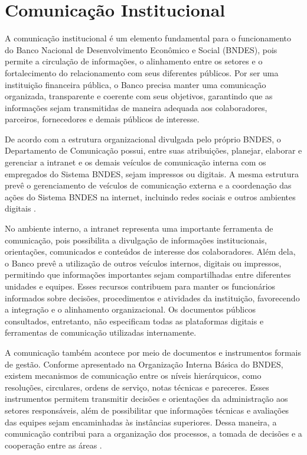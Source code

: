 \section{Comunicação Institucional}

A comunicação institucional é um elemento fundamental para o funcionamento do Banco Nacional de Desenvolvimento Econômico e Social (BNDES), pois permite a circulação de informações, o alinhamento entre os setores e o fortalecimento do relacionamento com seus diferentes públicos. Por ser uma instituição financeira pública, o Banco precisa manter uma comunicação organizada, transparente e coerente com seus objetivos, garantindo que as informações sejam transmitidas de maneira adequada aos colaboradores, parceiros, fornecedores e demais públicos de interesse.

De acordo com a estrutura organizacional divulgada pelo próprio BNDES, o Departamento de Comunicação possui, entre suas atribuições, planejar, elaborar e gerenciar a intranet e os demais veículos de comunicação interna com os empregados do Sistema BNDES, sejam impressos ou digitais. A mesma estrutura prevê o gerenciamento de veículos de comunicação externa e a coordenação das ações do Sistema BNDES na internet, incluindo redes sociais e outros ambientes digitais \cite{bndes2026quemsomos}.

No ambiente interno, a intranet representa uma importante ferramenta de comunicação, pois possibilita a divulgação de informações institucionais, orientações, comunicados e conteúdos de interesse dos colaboradores. Além dela, o Banco prevê a utilização de outros veículos internos, digitais ou impressos, permitindo que informações importantes sejam compartilhadas entre diferentes unidades e equipes. Esses recursos contribuem para manter os funcionários informados sobre decisões, procedimentos e atividades da instituição, favorecendo a integração e o alinhamento organizacional. Os documentos públicos consultados, entretanto, não especificam todas as plataformas digitais e ferramentas de comunicação utilizadas internamente.

A comunicação também acontece por meio de documentos e instrumentos formais de gestão. Conforme apresentado na Organização Interna Básica do BNDES, existem mecanismos de comunicação entre os níveis hierárquicos, como resoluções, circulares, ordens de serviço, notas técnicas e pareceres. Esses instrumentos permitem transmitir decisões e orientações da administração aos setores responsáveis, além de possibilitar que informações técnicas e avaliações das equipes sejam encaminhadas às instâncias superiores. Dessa maneira, a comunicação contribui para a organização dos processos, a tomada de decisões e a cooperação entre as áreas \cite{bndes2026oib}.

